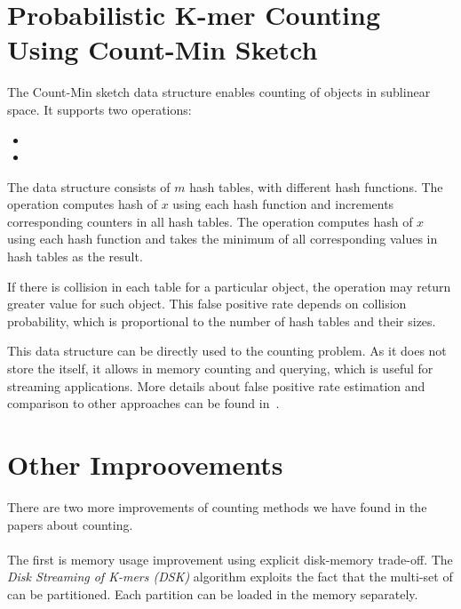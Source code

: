 \section{Probabilistic K-mer Counting Using Count-Min Sketch}

The Count-Min sketch\cite{countminsketch} data structure enables counting of objects in sublinear space. It supports two operations:
\begin{itemize}
  \item {} %
  \item {} %
\end{itemize}

The data structure consists of $m$ hash tables, with different hash functions.
The  operation computes hash of $x$ using each hash function and increments corresponding counters in all hash tables. The  operation computes hash of $x$ using each hash function and takes the minimum of all corresponding values in hash tables as the result. %

If there is collision in each table for a particular object, the  operation may return greater value for such object. This false positive rate depends on collision probability, which is proportional to the number of hash tables and their sizes.

This data structure can be directly used to the \kmer counting problem. As it does not store the \kmers itself, it allows in memory \kmer counting and querying, which is useful for streaming applications.
More details about false positive rate estimation and comparison to other approaches can be found in~\cite{khmer}.

\section{Other Improovements}

There are two more improvements of \kmer counting methods we have found in the papers about \kmer counting.

\paragraph{} The first is memory usage improvement using explicit disk-memory trade-off. The \emph{Disk Streaming of K-mers (DSK)} algorithm\cite{dsk} exploits the fact that the multi-set of \kmers can be partitioned. Each partition can be loaded in the memory separately.

